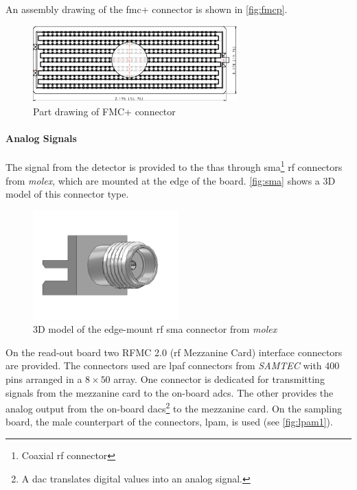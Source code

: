 An assembly drawing of the \gls{fmc}+ connector is shown in \autoref{fig:fmcp}.

\begin{figure}[tbh]
	\centering
	\includegraphics[width = 0.7\textwidth]{chap/04-work/img/fmcp.pdf}
	\caption[Rendering of FMC+ connector]{Part drawing of FMC+ connector \cite{fmcpic}}
	\label{fig:fmcp}
\end{figure}

\paragraph{Analog Signals}
The signal from the detector is provided to the \glspl{tha} through \gls{sma}\footnote{Coaxial \gls{rf} connector} \gls{rf} connectors from \textit{molex}, which are mounted at the edge of the board.
\autoref{fig:sma} shows a 3D model of this connector type. 

\begin{figure}[tbh]
	\centering
	\includegraphics[width = 0.5\textwidth]{chap/04-work/img/sma}
	\caption[Edge-Mount RF SMA connector]{3D model of the edge-mount \gls{rf} \gls{sma} connector from \textit{molex} \cite{molex}}
	\label{fig:sma}
\end{figure}

On the read-out board two RFMC 2.0 (\gls{rf} Mezzanine Card) interface connectors are provided.
The connectors used are \gls{lpaf} connectors from \textit{SAMTEC} with 400 pins arranged in a $8\times50$ array.
One connector is dedicated for transmitting signals from the mezzanine card to the on-board \glspl{adc}.
The other provides the analog output from the on-board \glspl{dac}\footnote{A \gls{dac} translates digital values into an analog signal.} to the mezzanine card.
On the sampling board, the male counterpart of the connectors, \gls{lpam}, is used (see \autoref{fig:lpam1}).

